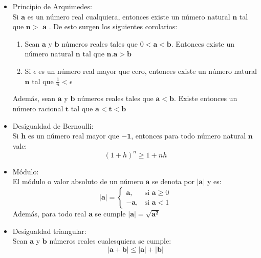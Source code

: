 \documentclass[a4paper,11pt]{report}
\begin{document}
\begin{itemize}
\item Principio de Arquimedes: \\
Si $\mathbf{a}$ es un número real cualquiera, entonces existe un número natural $\mathbf{n}$ tal que $\mathbf{n} >$ $\mathbf{a}$ . De esto surgen los siguientes corolarios: \\
\begin{enumerate}
\item Sean $\mathbf{a}$ y $\mathbf{b}$ números reales tales que $0 < \mathbf{a} < \mathbf{b}$. Entonces existe un número natural $\mathbf{n}$ tal que $\mathbf{n.a} > \mathbf{b}$
\item Si $\epsilon$ es un número real mayor que cero, entonces existe un número natural $\mathbf{n}$ tal que $\frac{1}{n} < \epsilon $
\end{enumerate}
Además, sean $\mathbf{a}$ y $\mathbf{b}$ números reales tales que $\mathbf{a} < \mathbf{b}$. Existe entonces un número racional $\mathbf{t}$ tal que $\mathbf{a} < \mathbf{t} < \mathbf{b}$
\item Desigualdad de Bernoulli: \\
Si $\mathbf{h}$ es un número real mayor que $\mathbf{-1}$, entonces para todo número natural $\mathbf{n}$ vale: \\
\begin{equation*}
(1+h)^n \geqslant 1+nh
\end{equation*}
\item Módulo: \\
El módulo o valor absoluto de un número $\mathbf{a}$ se denota por $\mathbf{|a|}$ y es:
\begin{equation*}
\mathbf{|a|} = \left\{
\begin{array}{rl}
\mathbf{a}, & \text{si } \mathbf{a} \geqslant 0  \\
\mathbf{-a}, & \text{si } \mathbf{a} <1
\end{array} \right.
\end{equation*}
Además, para todo real $\mathbf{a}$ se cumple $\mathbf{|a| = \sqrt{a^2}}$
\item Desigualdad triangular: \\
Sean $\mathbf{a}$ y $\mathbf{b}$ números reales cualesquiera se cumple: \\
\begin{equation*}
\mathbf{|a+b| \leqslant |a|+|b|}
\end{equation*}

\newpage



\end{itemize}
\end{document}
